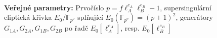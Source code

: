 \documentclass[12pt]{report}
\begin{document}
\begin{figure}[h]
\begin{center} 
\end{center}
\end{figure}


\begin{figure}[h]
\begin{center} 
\makebox[1cm]{\rule{17.3cm}{0.4pt}}\\
\hspace{-1.35cm} \textbf{Veřejné parametry:} Prvočíslo $p = f \ell_A ^{e_A} \ell_B ^{e_B} - 1$, supersingulární eliptická křivka $E_0/\mathbb{F}_{p^2}$ splňující $E_0(\mathbb{F}_{p^2}) = (p+1)^2$, generátory $G_{1A},G_{2A},G_{1B},G_{2B}$ po řadě $E_0[\ell_A ^{e_A}]$, resp. $E_0[\ell_B ^{e_B}]$\\


\end{center}
\end{figure}
\end{document}
